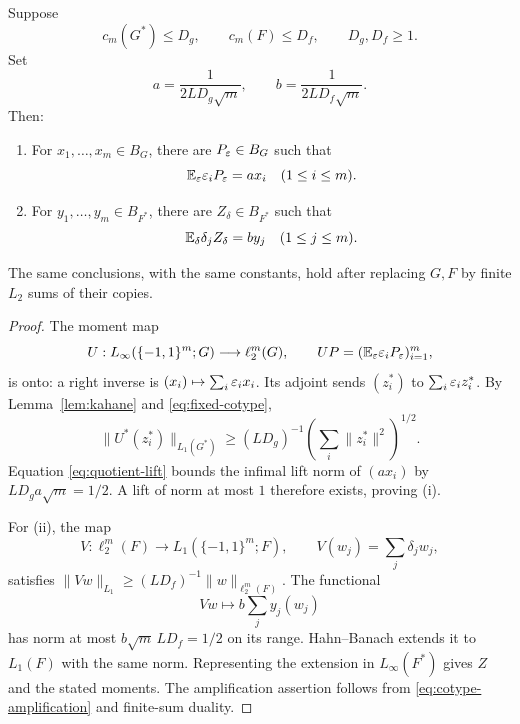 \begin{lemma}\label{lem:lifts}
Suppose
\[
c_m(G^*)\le D_g,\qquad c_m(F)\le D_f,
\qquad D_g,D_f\ge1.
\]
Set
\begin{equation}\label{eq:lift-parameters}
a=\frac1{2LD_g\sqrt m},\qquad
b=\frac1{2LD_f\sqrt m}.
\end{equation}
Then:
\begin{enumerate}[label=\textup{(\roman*)}]
\item For \(x_1,\ldots,x_m\in B_G\), there are \(P_\varepsilon\in B_G\) such that
\[
\mathbb E_\varepsilon\varepsilon_iP_\varepsilon=ax_i\quad(1\le i\le m).
\]
\item For \(y_1,\ldots,y_m\in B_{F^*}\), there are \(Z_\delta\in B_{F^*}\)
such that
\[
\mathbb E_\delta\delta_jZ_\delta=by_j\quad(1\le j\le m).
\]
\end{enumerate}
The same conclusions, with the same constants, hold after replacing
\(G,F\) by finite \(L_2\) sums of their copies.
\end{lemma}
\begin{proof}
The moment map
\[
U:L_\infty(\{-1,1\}^m;G)\longrightarrow\ell_2^m(G),
\qquad
UP=(\mathbb E_\varepsilon\varepsilon_iP_\varepsilon)_{i=1}^m,
\]
is onto: a right inverse is \((x_i)\mapsto\sum_i\varepsilon_i x_i\).
Its adjoint sends \((z_i^*)\) to \(\sum_i\varepsilon_i z_i^*\).
By Lemma~\ref{lem:kahane} and \eqref{eq:fixed-cotype},
\[
\|U^*(z_i^*)\|_{L_1(G^*)}
\ge(LD_g)^{-1}\left(\sum_i\|z_i^*\|^2\right)^{1/2}.
\]
Equation \eqref{eq:quotient-lift} bounds the infimal lift norm of
\((ax_i)\) by \(LD_ga\sqrt m=1/2\). A lift of norm at most \(1\)
therefore exists, proving (i).

For (ii), the map
\[
V:\ell_2^m(F)\longrightarrow L_1(\{-1,1\}^m;F),
\qquad
V(w_j)=\sum_j\delta_jw_j,
\]
satisfies
\(\|Vw\|_{L_1}\ge(LD_f)^{-1}\|w\|_{\ell_2^m(F)}\).
The functional
\[
Vw\longmapsto b\sum_j y_j(w_j)
\]
has norm at most \(b\sqrt m\,LD_f=1/2\) on its range.
Hahn--Banach extends it to \(L_1(F)\) with the same norm.
Representing the extension in \(L_\infty(F^*)\) gives \(Z\) and the
stated moments. The amplification assertion follows from
\eqref{eq:cotype-amplification} and finite-sum duality.
\end{proof}
